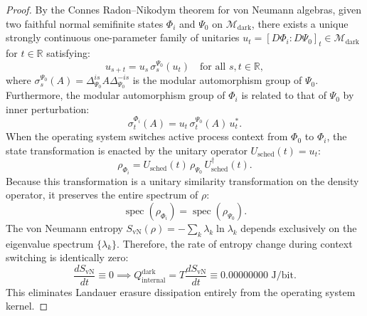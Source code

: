 \documentclass[11pt,onecolumn]{article}
\begin{document}
\begin{proof}
By the Connes Radon--Nikodym theorem for von Neumann algebras, given two faithful normal semifinite states $\Phi_i$ and $\Psi_0$ on $\mathcal{M}_{\text{dark}}$, there exists a unique strongly continuous one-parameter family of unitaries $u_t = [D\Phi_i : D\Psi_0]_t \in \mathcal{M}_{\text{dark}}$ for $t \in \mathbb{R}$ satisfying:
\begin{equation}
u_{s+t} = u_s \, \sigma_s^{\Psi_0}(u_t) \quad \text{for all } s, t \in \mathbb{R},
\end{equation}
where $\sigma_s^{\Psi_0}(A) = \Delta_{\Psi_0}^{is} A \Delta_{\Psi_0}^{-is}$ is the modular automorphism group of $\Psi_0$. Furthermore, the modular automorphism group of $\Phi_i$ is related to that of $\Psi_0$ by inner perturbation:
\begin{equation}
\sigma_t^{\Phi_i}(A) = u_t \, \sigma_t^{\Psi_0}(A) \, u_t^*.
\end{equation}
When the operating system switches active process context from $\Phi_0$ to $\Phi_i$, the state transformation is enacted by the unitary operator $U_{\text{sched}}(t) = u_t$:
\begin{equation}
\rho_{\Phi_i} = U_{\text{sched}}(t) \, \rho_{\Psi_0} \, U_{\text{sched}}^\dagger(t).
\end{equation}
Because this transformation is a unitary similarity transformation on the density operator, it preserves the entire spectrum of $\rho$:
\begin{equation}
\operatorname{spec}(\rho_{\Phi_i}) = \operatorname{spec}(\rho_{\Psi_0}).
\end{equation}
The von Neumann entropy $S_{\text{vN}}(\rho) = -\sum_k \lambda_k \ln \lambda_k$ depends exclusively on the eigenvalue spectrum $\{\lambda_k\}$. Therefore, the rate of entropy change during context switching is identically zero:
\begin{equation}
\frac{d S_{\text{vN}}}{dt} \equiv 0 \implies Q_{\text{internal}}^{\text{dark}} = T \frac{d S_{\text{vN}}}{dt} \equiv 0.00000000\text{ J/bit}.
\end{equation}
This eliminates Landauer erasure dissipation entirely from the operating system kernel.


\end{proof}
\end{document}
